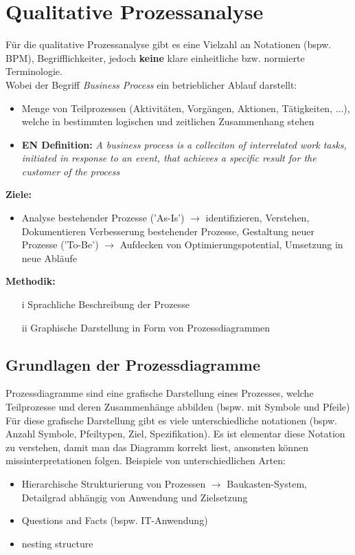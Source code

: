 \documentclass{report}
\theoremstyle{definition}
\theoremstyle{example}
\begin{document}
\section{Qualitative Prozessanalyse}
Für die qualitative Prozessanalyse gibt es eine Vielzahl an Notationen (bspw. BPM), Begrifflichkeiter, jedoch \textbf{keine} klare einheitliche bzw. normierte Terminologie.\\
Wobei der Begriff \textit{Business Process} ein betrieblicher Ablauf darstellt:
\begin{itemize}
   \item Menge von Teilprozessen (Aktivitäten, Vorgängen, Aktionen, Tätigkeiten, ...), welche in bestimmten logischen und zeitlichen Zusammenhang stehen
   \item \textbf{EN Definition:} \textit{A business process is a colleciton of interrelated work tasks, initiated in response to an event, that achieves a specific result for the customer of the process}
\end{itemize}

\textbf{Ziele:}
\begin{itemize}
   \item Analyse bestehender Prozesse ('As-Is') $\rightarrow$ identifizieren, Verstehen, Dokumentieren
   Verbesserung bestehender Prozesse, Gestaltung neuer Prozesse ('To-Be') $\rightarrow$ Aufdecken von Optimierungspotential, Umsetzung in neue Abläufe
\end{itemize}

\textbf{Methodik:}
\begin{itemize}
   \item[i] Sprachliche Beschreibung der Prozesse
   \item[ii] Graphische Darstellung in Form von Prozessdiagrammen 
\end{itemize}

   \subsection{Grundlagen der Prozessdiagramme}
Prozessdiagramme sind eine grafische Darstellung eines Prozesses, welche Teilprozesse und deren Zusammenhänge abbilden (bspw. mit Symbole und Pfeile)\\
Für diese grafische Darstellung gibt es viele unterschiedliche notationen (bspw. Anzahl Symbole, Pfeiltypen, Ziel, Spezifikation). Es ist elementar diese Notation zu verstehen, damit man das Diagramm korrekt liest, 
ansonsten können missinterpretationen folgen. Beispiele von unterschiedlichen Arten:
\begin{itemize}
   \item Hierarchische Strukturierung von Prozessen $\rightarrow$ Baukasten-System, Detailgrad abhängig von Anwendung und Zielsetzung
   \item Questions and Facts (bspw. IT-Anwendung)
   \item nesting structure
\end{itemize}
\end{document}
